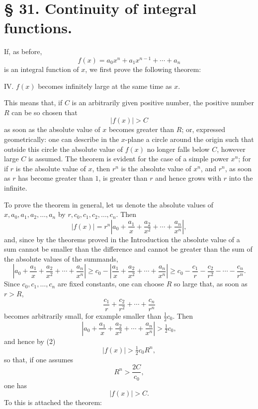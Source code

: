 \documentclass[11pt]{article}
\begin{document}
\section*{§ 31. Continuity of integral functions.}

If, as before,
\[
 f(x)=a_0x^n+a_1x^{n-1}+\cdots+a_n
\]
is an integral function of $x$, we first prove the following theorem:

\medskip
\noindent IV. $f(x)$ becomes infinitely large at the same time as $x$.
\medskip

This means that, if $C$ is an arbitrarily given positive number, the positive number $R$ can be so chosen that
\[
 |f(x)|>C
\]
as soon as the absolute value of $x$ becomes greater than $R$; or, expressed geometrically: one can describe in the $x$-plane a circle around the origin such that outside this circle the absolute value of $f(x)$ no longer falls below $C$, however large $C$ is assumed. The theorem is evident for the case of a simple power $x^n$; for if $r$ is the absolute value of $x$, then $r^n$ is the absolute value of $x^n$, and $r^n$, as soon as $r$ has become greater than $1$, is greater than $r$ and hence grows with $r$ into the infinite.

To prove the theorem in general, let us denote the absolute values of $x,a_0,a_1,a_2,\ldots,a_n$ by $r,c_0,c_1,c_2,\ldots,c_n$. Then
\begin{equation}
 |f(x)|=r^n\left|a_0+\frac{a_1}{x}+\frac{a_2}{x^2}+\cdots+\frac{a_n}{x^n}\right|,
\tag{2}
\end{equation}
and, since by the theorems proved in the Introduction the absolute value of a sum cannot be smaller than the difference and cannot be greater than the sum of the absolute values of the summands,
\[
\left|a_0+\frac{a_1}{x}+\frac{a_2}{x^2}+\cdots+\frac{a_n}{x^n}\right|
\ge c_0-\left|\frac{a_1}{x}+\frac{a_2}{x^2}+\cdots+\frac{a_n}{x^n}\right|
\ge c_0-\frac{c_1}{r}-\frac{c_2}{r^2}-\cdots-\frac{c_n}{r^n}.
\]
Since $c_0,c_1,\ldots,c_n$ are fixed constants, one can choose $R$ so large that, as soon as $r>R$,
\[
 \frac{c_1}{r}+\frac{c_2}{r^2}+\cdots+\frac{c_n}{r^n}
\]
becomes arbitrarily small, for example smaller than $\tfrac12c_0$. Then
\[
 \left|a_0+\frac{a_1}{x}+\frac{a_2}{x^2}+\cdots+\frac{a_n}{x^n}\right|>\tfrac12c_0,
\]
and hence by (2)
\[
 |f(x)|>\tfrac12c_0R^n,
\]
so that, if one assumes
\begin{equation}
 R^n>\frac{2C}{c_0},
\tag{3}
\end{equation}
one has
\[
 |f(x)|>C.
\]
To this is attached the theorem:
\end{document}
